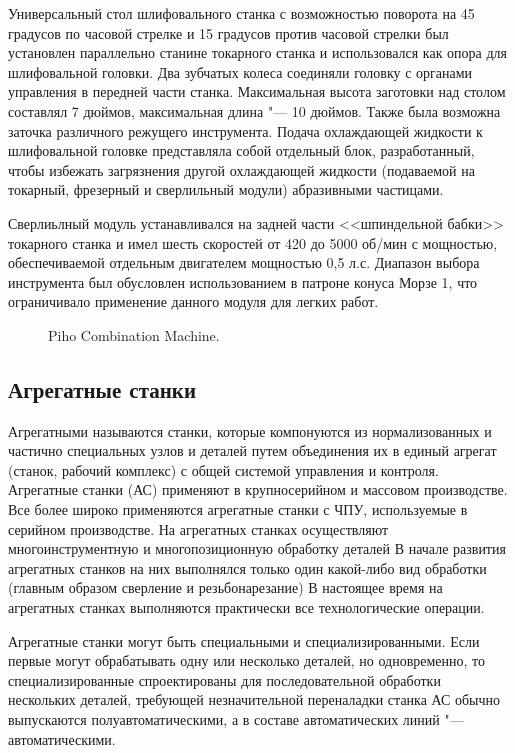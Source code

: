Универсальный стол шлифовального станка с возможностью поворота на 45 градусов по часовой стрелке и 15 градусов против часовой стрелки был установлен параллельно станине токарного станка и использовался как опора для шлифовальной головки. Два зубчатых колеса соединяли головку с органами управления в передней части станка. Максимальная высота заготовки над столом составлял 7 дюймов, максимальная длина "--- 10 дюймов. Также была возможна заточка различного режущего инструмента. Подача охлаждающей жидкости к шлифовальной головке представляла собой отдельный блок, разработанный, чтобы избежать загрязнения другой охлаждающей жидкости (подаваемой на токарный, фрезерный и сверлильный модули) абразивными частицами.

Сверлиьлный модуль устанавливался на задней части <<шпиндельной бабки>> токарного станка и имел шесть скоростей от 420 до 5000 об/мин с мощностью, обеспечиваемой отдельным двигателем мощностью 0,5 л.с. Диапазон выбора инструмента был обусловлен использованием в патроне конуса Морзе 1, что ограничивало применение данного модуля для легких работ.

\begin{figure}[ht]
	\caption{Piho Combination Machine.}\label{fig:adcock-2adcock}
\end{figure}

\subsection{Агрегатные станки}

Агрегатными называются станки, которые компонуются из нормализованных и частично специальных узлов и деталей путем объединения их в единый агрегат (станок, рабочий комплекс) с общей системой управления и контроля. Агрегатные станки (АС) применяют в крупносерийном и массовом производстве. Все более широко применяются агрегатные станки с ЧПУ, используемые в серийном производстве. На агрегатных станках осуществляют многоинструментную и многопозиционную обработку деталей В начале развития агрегатных станков на них выполнялся только один какой-либо вид обработки (главным образом сверление и резьбонарезание) В настоящее время на агрегатных станках выполняются практически все технологические операции.

Агрегатные станки могут быть специальными и специализированными. Если первые могут обрабатывать одну или несколько деталей, но одновременно, то специализированные спроектированы для последовательной обработки нескольких деталей, требующей незначительной переналадки станка АС обычно выпускаются полуавтоматическими, а в составе автоматических линий "--- автоматическими.

